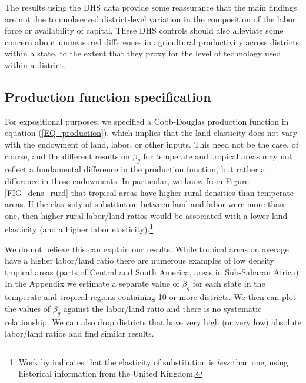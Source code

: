 \documentclass[11pt]{article}
\begin{document}
The results using the DHS data provide some reassurance that the main findings are not due to unobserved district-level variation in the composition of the labor force or availability of capital. These DHS controls should also alleviate some concern about unmeasured differences in agricultural productivity across districts within a state, to the extent that they proxy for the level of technology used within a district.

\subsection{Production function specification}
For expositional purposes, we specified a Cobb-Douglas production function in equation (\ref{EQ_production}), which implies that the land elasticity does not vary with the endowment of land, labor, or other inputs. This need not be the case, of course, and the different results on $\beta_g$ for temperate and tropical areas may not reflect a fundamental difference in the production function, but rather a difference in those endowments. In particular, we know from Figure \ref{FIG_dens_rurd} that tropical areas have higher rural densities than temperate areas. If the elasticity of substitution between land and labor were more than one, then higher rural labor/land ratios would be associated with a lower land elasticity (and a higher labor elasticity).\footnote{Work by \citet{wilde2012} indicates that the elasticity of substitution is \textit{less} than one, using historical information from the United Kingdom.}

We do not believe this can explain our results. While tropical areas on average have a higher labor/land ratio there are numerous examples of low density tropical areas (parts of Central and South America, areas in Sub-Saharan Africa). In the Appendix we estimate a separate value of $\beta_g$ for each state in the temperate and tropical regions containing 10 or more districts. We then can plot the values of $\beta_g$ against the labor/land ratio and there is no systematic relationship. We can also drop districts that have very high (or very low) absolute labor/land ratios and find similar results.
\end{document}
